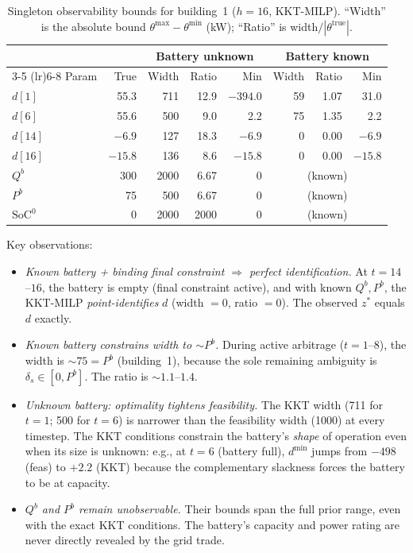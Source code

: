 \documentclass[11pt,a4paper]{article}
\newcommand{\deltas}{\delta_s}
\newcommand{\netload}{d}
\newcommand{\Qb}{{Q^b}}
\newcommand{\Pb}{{P^b}}
\newcommand{\SoC}{{\text{SoC}^0}}
\begin{document}
\begin{table}[ht]
\centering
\caption{Singleton observability bounds for building~1 ($h=16$, KKT-MILP). ``Width'' is the absolute bound $\theta^{\max}-\theta^{\min}$ (kW); ``Ratio'' is width$/|\theta^{\text{true}}|$.}
\label{tab:singleton}
\small
\begin{tabular}{lr rr rr rr}
\toprule
& & \multicolumn{3}{c}{Battery unknown} & \multicolumn{3}{c}{Battery known} \\
\cmidrule(lr){3-5} \cmidrule(lr){6-8}
Param & True & Width & Ratio & Min & Width & Ratio & Min \\
\midrule
$\netload[1]$ & 55.3 & 711 & 12.9 & $-394.0$ & 59 & 1.07 & 31.0 \\
$\netload[6]$ & 55.6 & 500 & 9.0 & 2.2 & 75 & 1.35 & 2.2 \\
$\netload[14]$ & $-6.9$ & 127 & 18.3 & $-6.9$ & 0 & 0.00 & $-6.9$ \\
$\netload[16]$ & $-15.8$ & 136 & 8.6 & $-15.8$ & 0 & 0.00 & $-15.8$ \\
$\Qb$ & 300 & 2000 & 6.67 & 0 & \multicolumn{3}{c}{(known)} \\
$\Pb$ & 75 & 500 & 6.67 & 0 & \multicolumn{3}{c}{(known)} \\
$\SoC$ & 0 & 2000 & 2000 & 0 & \multicolumn{3}{c}{(known)} \\
\bottomrule
\end{tabular}
\end{table}

Key observations:
\begin{itemize}[nosep]
    \item \emph{Known battery + binding final constraint $\Rightarrow$ perfect identification.} At $t=14$--$16$, the battery is empty (final constraint active), and with known $\Qb, \Pb$, the KKT-MILP \emph{point-identifies} $\netload$ (width $= 0$, ratio $= 0$). The observed $z^*$ equals $\netload$ exactly.
    \item \emph{Known battery constrains width to $\sim\Pb$.} During active arbitrage ($t=1$--$8$), the width is $\sim 75 = \Pb$ (building~1), because the sole remaining ambiguity is $\deltas \in [0, \Pb]$. The ratio is $\sim 1.1$--$1.4$.
    \item \emph{Unknown battery: optimality tightens feasibility.} The KKT width (711 for $t=1$; 500 for $t=6$) is narrower than the feasibility width (1000) at every timestep. The KKT conditions constrain the battery's \emph{shape} of operation even when its size is unknown: e.g., at $t=6$ (battery full), $\netload^{\min}$ jumps from $-498$ (feas) to $+2.2$ (KKT) because the complementary slackness forces the battery to be at capacity.
    \item \emph{$\Qb$ and $\Pb$ remain unobservable.} Their bounds span the full prior range, even with the exact KKT conditions. The battery's capacity and power rating are never directly revealed by the grid trade.
\end{itemize}
\end{document}
